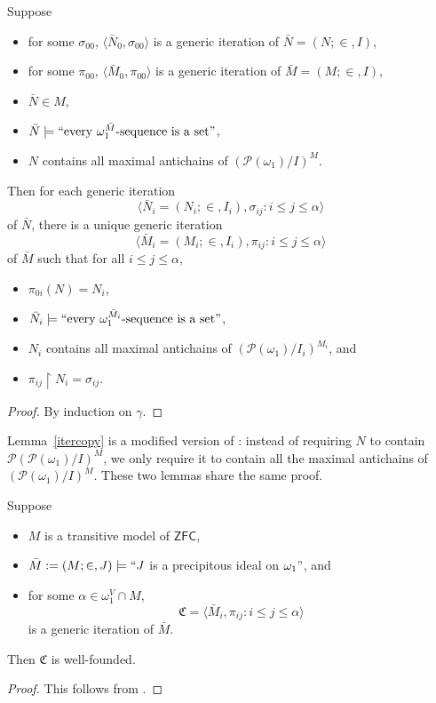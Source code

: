 \documentclass[12pt]{article}
\numberwithin{equation}{section}
\begin{document}
\begin{lem}\label{itercopy}
Suppose 
\begin{itemize}
    \item for some $\sigma_{00}$, $\langle \bar{N}_0, \sigma_{00} \rangle$ is a generic iteration of $\bar{N} = (N; \in, I)$,
    \item for some $\pi_{00}$, $\langle \bar{M}_0, \pi_{00} \rangle$ is a generic iteration of $\bar{M} = (M; \in, I)$,
    \item $\bar{N} \in M$,
    \item $\bar{N} \models ``\text{every } {\omega_1^{\bar{M}}} \text{-sequence is a set}"$,
    \item $N$ contains all maximal antichains of $(\mathcal{P}(\omega_1) / I)^{M}$.
\end{itemize}
Then for each generic iteration $$\langle \bar{N}_i = (N_i; \in, I_i), \sigma_{ij} : i \leq j \leq \alpha \rangle$$ of $\bar{N}$, there is a unique generic iteration $$\langle \bar{M}_i = (M_i; \in, I_i), \pi_{ij} : i \leq j \leq \alpha \rangle$$ of $\bar{M}$ such that for all $i \leq j \leq \alpha$,
\begin{itemize}
    \item $\pi_{0i}(N) = N_i$,
    \item $\bar{N}_i \models ``\text{every } {\omega_1^{\bar{M}_i}} \text{-sequence is a set}"$,
    \item $N_i$ contains all maximal antichains of $(\mathcal{P}(\omega_1) / I_i)^{M_i}$, and
    \item $\pi_{ij} \restriction N_i = \sigma_{ij}$.
\end{itemize}
\end{lem}
\begin{proof}
By induction on $\gamma$.
\end{proof}

Lemma~\ref{itercopy} is a modified version of \cite[Lemma 1.5]{larson}: instead of requiring $N$ to contain $\mathcal{P}(\mathcal{P}(\omega_1) / I)^{M}$, we only require it to contain all the maximal antichains of $(\mathcal{P}(\omega_1) / I)^{M}$. These two lemmas share the same proof.

\begin{lem}\label{iterlength}
Suppose
\begin{itemize}
    \item $M$ is a transitive model of $\mathsf{ZFC}$,
    \item $\bar{M} := (M; \in, J) \models ``J$ is a precipitous ideal on $\omega_1"$, and
    \item for some $\alpha \in \omega_1^V \cap M$, $$\mathfrak{C} = \langle \bar{M}_i, \pi_{ij} : i \leq j \leq \alpha \rangle$$ is a generic iteration of $\bar{M}$.
\end{itemize}
Then $\mathfrak{C}$ is well-founded.
\end{lem}
\begin{proof}
This follows from \cite[Lemma 1.6]{larson}.
\end{proof}
\end{document}

